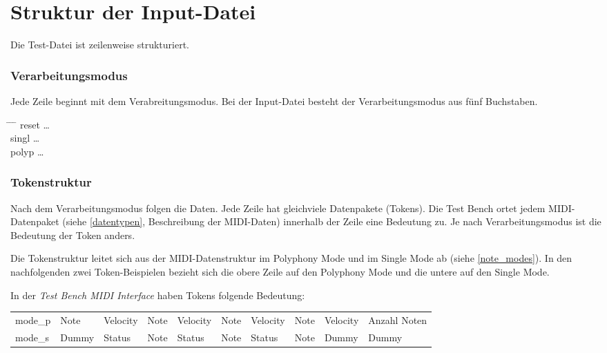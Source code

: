 \section{Struktur der Input-Datei}\label{sec.testbench_inputdatei} 

Die Test-Datei ist zeilenweise strukturiert.

\subsubsection{Verarbeitungsmodus} 

Jede Zeile beginnt mit dem Verabreitungsmodus. Bei der Input-Datei besteht der Verarbeitungsmodus aus fünf Buchstaben.

\begin{tabbing}
\hspace{4em} \= \hspace{2em} \= \hspace{2em} \=\kill
reset	  \> \ldots{}\\
singl	  \> \ldots{}\\
polyp	  \> \ldots{}
\end{tabbing}

\subsubsection{Tokenstruktur} 

Nach dem Verarbeitungsmodus folgen die Daten. Jede Zeile hat gleichviele Datenpakete (Tokens). 
Die Test Bench ortet jedem MIDI-Datenpaket (siehe \ref {datentypen}, Beschreibung der MIDI-Daten) innerhalb der Zeile eine Bedeutung zu. Je nach Verarbeitungsmodus ist die Bedeutung der Token anders.

Die Tokenstruktur leitet sich aus der MIDI-Datenstruktur im Polyphony Mode und im Single Mode ab (siehe  \ref{note_modes}). In den nachfolgenden zwei Token-Beispielen bezieht sich die obere Zeile auf den Polyphony Mode und die untere auf den Single Mode.

In der \textit{Test Bench MIDI Interface} haben Tokens folgende Bedeutung:

{
\renewcommand{\arraystretch}{1.0} %
\begin{tabular}{@{}*{10}{l}@{}} %
mode\_p	& Note & Velocity	& Note & Velocity & Note & Velocity & Note & Velocity & Anzahl Noten \\
mode\_s	& Dummy & Status & Note & Status & Note & Status & Note & Dummy & Dummy
\end{tabular}
}

